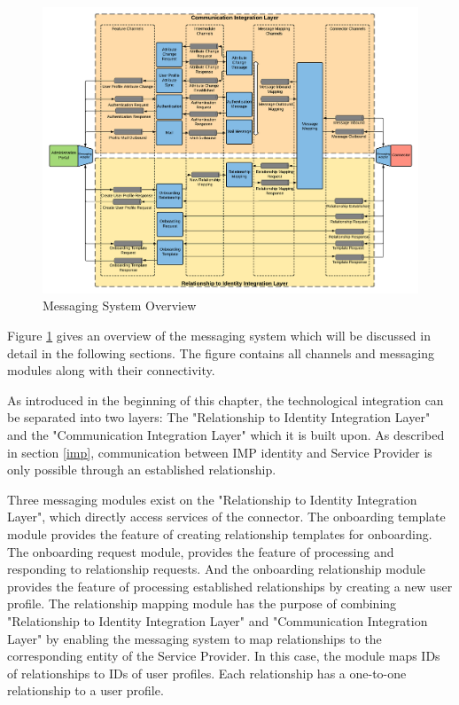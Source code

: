 \begin{figure}[h!]
    \centering
    \includegraphics[scale=0.45]{Diagrams/Integration Architecture 1/Technological Integration/4. Messaging Overview.pdf}
    \caption{Messaging System Overview}
    \label{integration1:messaging_system_overview}
\end{figure}

Figure \ref{integration1:messaging_system_overview} gives an overview of the messaging system which will be discussed in detail in the following sections. The figure contains all channels and messaging modules along with their connectivity.

As introduced in the beginning of this chapter, the technological integration can be separated into two layers: The "Relationship to Identity Integration Layer" and the "Communication Integration Layer" which it is built upon. As described in section \ref{imp}, communication between IMP identity and Service Provider is only possible through an established relationship.

Three messaging modules exist on the "Relationship to Identity Integration Layer", which directly access services of the connector. The onboarding template module provides the feature of creating relationship templates for onboarding. The onboarding request module, provides the feature of processing and responding to relationship requests. And the onboarding relationship module provides the feature of processing established relationships by creating a new user profile. The relationship mapping module has the purpose of combining "Relationship to Identity Integration Layer" and "Communication Integration Layer" by enabling the messaging system to map relationships to the corresponding entity of the Service Provider. In this case, the module maps IDs of relationships to IDs of user profiles. Each relationship has a one-to-one relationship to a user profile.

